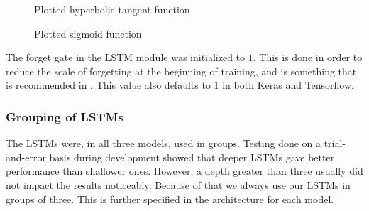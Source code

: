 \begin{figure}[ht]
    \begin{minipage}[t]{.5\textwidth}
        \centering
        \captionsetup{justification=centering}
        \caption{Plotted hyperbolic tangent function}
        \label{fig:plot_function_tanh}
    \end{minipage}%
    \begin{minipage}[t]{.5\textwidth}
        \centering
        \captionsetup{justification=centering}
        \caption{Plotted sigmoid function}
        \label{fig:plot_function_sigmoid}
    \end{minipage}%
\end{figure}

The forget gate in the LSTM module was initialized to \(1\). This is done in order to reduce the scale of forgetting at the beginning of training, and is something that is recommended in \citep{zaremba2015empirical}. This value also defaults to \(1\) in both Keras and Tensorflow.

\subsubsection{Grouping of LSTMs}
The LSTMs were, in all three models, used in groups. Testing done on a trial-and-error basis during development showed that deeper LSTMs gave better performance than shallower ones. However, a depth greater than three usually did not impact the results noticeably. Because of that we always use our LSTMs in groups of three. This is further specified in the architecture for each model.


